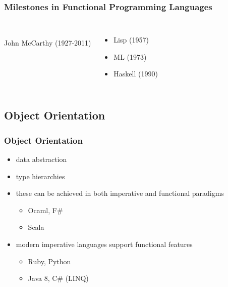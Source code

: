 \documentclass[dvipsnames]{beamer}
\theoremstyle{plain}
\begin{document}
\begin{frame}
  \frametitle{Milestones in Functional Programming Languages}

  \begin{columns}
    \begin{center}
      \\
      John McCarthy (1927-2011)
    \end{center}

    \begin{itemize}
      \item Lisp (1957)
      \item ML (1973)
      \item Haskell (1990)
    \end{itemize}
  \end{columns}
\end{frame}

\subsection{Object Orientation}

\begin{frame}
  \frametitle{Object Orientation}

  \begin{itemize}
    \item data abstraction
    \item type hierarchies

    \bigskip
    \item these can be achieved in both imperative and functional paradigms
    \begin{itemize}
      \item Ocaml, F\#
      \item Scala
    \end{itemize}

    \bigskip
    \item modern imperative languages support functional features
    \begin{itemize}
      \item Ruby, Python
      \item Java 8, C\# (LINQ)
    \end{itemize}
  \end{itemize}
\end{frame}
% 
% 
% 
\end{document}
